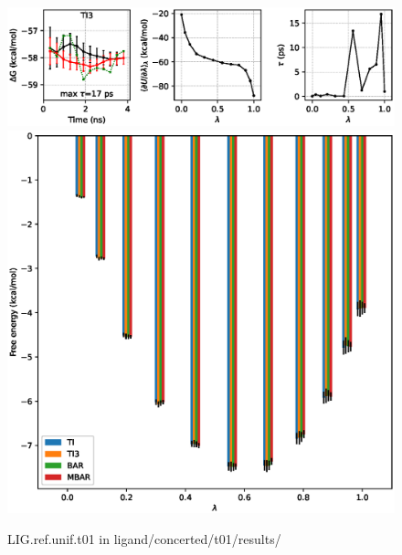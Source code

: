 \documentclass[journal=jctcce,manuscript=article,hyperref=false]{achemso}
\begin{document}
\clearpage
\pagebreak
\begin{figure}
\includegraphics[clip,width=6in]{ligand.concerted.t01.results..GvsT.eps}\vspace{-0.3cm}
\includegraphics[clip,width=6in]{ligand.concerted.t01.results..GvsL.eps}\vspace{-0.3cm}
\caption{LIG.ref.unif.t01 in ligand/concerted/t01/results/}
\end{figure}
\end{document}
